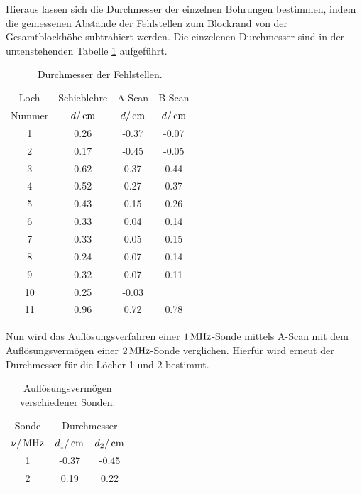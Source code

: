 Hieraus lassen sich die Durchmesser der einzelnen Bohrungen bestimmen, indem
die gemessenen Abstände der Fehlstellen zum Blockrand von der Gesamtblockhöhe
subtrahiert werden. Die einzelenen Durchmesser sind in der untenstehenden
Tabelle \ref{tab:durch} aufgeführt.
\begin{table}[H]
  \centering
  \begin{tabular}{cccc}
    \toprule
    \multicolumn{1}{c}{Loch}&\multicolumn{1}{c}{Schieblehre}&
    \multicolumn{1}{c}{A-Scan}&\multicolumn{1}{c}{B-Scan} \\
    Nummer & $d/\,\si{\centi\meter}$ & $d/\,\si{\centi\meter}$ & $d/\,\si{\centi\meter}$ \\
    \midrule
     1 & 0.26 & -0.37  &  -0.07      \\
     2 & 0.17 & -0.45  &  -0.05      \\
     3 & 0.62 &  0.37  &   0.44      \\
     4 & 0.52 &  0.27  &   0.37      \\
     5 & 0.43 &  0.15  &   0.26      \\
     6 & 0.33 &  0.04  &   0.14      \\
     7 & 0.33 &  0.05  &   0.15      \\
     8 & 0.24 &  0.07  &   0.14      \\
     9 & 0.32 &  0.07  &   0.11      \\
    10 & 0.25 & -0.03  &  \hrulefill \\
    11 & 0.96 &  0.72  &   0.78      \\
    \bottomrule
  \end{tabular}
  \caption{Durchmesser der Fehlstellen.}
  \label{tab:durch}
\end{table}
Nun wird das Auflösungsverfahren einer $1\,\si{\mega\hertz}$-Sonde mittels A-Scan mit dem
Auflösungsvermögen einer $2\,\si{\mega\hertz}$-Sonde verglichen. Hierfür wird erneut der
Durchmesser für die Löcher 1 und 2 bestimmt.
\begin{table}[H]
  \centering
  \begin{tabular}{ccc}
    \toprule
    \multicolumn{1}{c}{Sonde}&\multicolumn{2}{c}{Durchmesser}\\
    $\nu/\,\si{\mega\hertz}$ & $d_1/\,\si{\centi\meter}$ & $d_2/\,\si{\centi\meter}$ \\
    \midrule
    1  &  -0.37  &  -0.45 \\
    2  &   0.19  &   0.22 \\
    \bottomrule
  \end{tabular}
  \caption{Auflösungsvermögen verschiedener Sonden.}
  \label{tab:auf}
\end{table}
